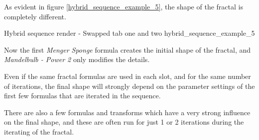 As evident in figure \ref{hybrid_sequence_example_5}, the shape of the fractal is completely different.

{Hybrid sequence render - Swapped tab one and two}
{hybrid_sequence_example_5}

Now the first \emph{Menger Sponge} formula creates the initial shape of the fractal, and \emph{Mandelbulb - Power 2} only modifies the details.

Even if the same fractal formulas are used in each slot, and for the same number of iterations, the final shape will strongly depend on the parameter settings of the first few formulas that are iterated in the sequence.

There are also a few formulas and transforms which have a very strong influence on the final shape, and these are often run for just 1 or 2 iterations during the iterating of the fractal.


